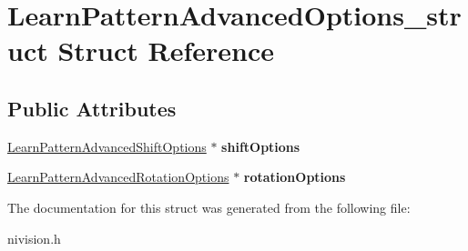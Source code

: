 \hypertarget{structLearnPatternAdvancedOptions__struct}{
\section{LearnPatternAdvancedOptions\_\-struct Struct Reference}
\label{structLearnPatternAdvancedOptions__struct}
}
\subsection*{Public Attributes}
\begin{DoxyCompactItemize}
\item 
\hypertarget{structLearnPatternAdvancedOptions__struct_ad4a7b5db40f74f337bbad5a220b6f583}{
\hyperlink{structLearnPatternAdvancedShiftOptions__struct}{LearnPatternAdvancedShiftOptions} $\ast$ {\bfseries shiftOptions}}
\label{structLearnPatternAdvancedOptions__struct_ad4a7b5db40f74f337bbad5a220b6f583}

\item 
\hypertarget{structLearnPatternAdvancedOptions__struct_afd145518c6b5e59905f1381e5f5846e6}{
\hyperlink{structLearnPatternAdvancedRotationOptions__struct}{LearnPatternAdvancedRotationOptions} $\ast$ {\bfseries rotationOptions}}
\label{structLearnPatternAdvancedOptions__struct_afd145518c6b5e59905f1381e5f5846e6}

\end{DoxyCompactItemize}


The documentation for this struct was generated from the following file:\begin{DoxyCompactItemize}
\item 
nivision.h\end{DoxyCompactItemize}

